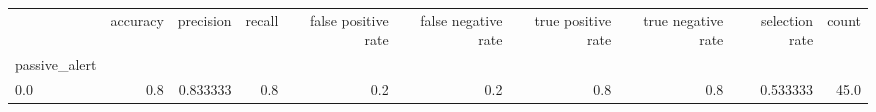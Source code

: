 \begin{tabular}{lrrrrrrrrr}
\toprule
{} &  accuracy &  precision &  recall &  false positive rate &  false negative rate &  true positive rate &  true negative rate &  selection rate &  count \\
passive\_alert &           &            &         &                      &                      &                     &                     &                 &        \\
\midrule
0.0           &       0.8 &   0.833333 &     0.8 &                  0.2 &                  0.2 &                 0.8 &                 0.8 &        0.533333 &   45.0 \\
\bottomrule
\end{tabular}
